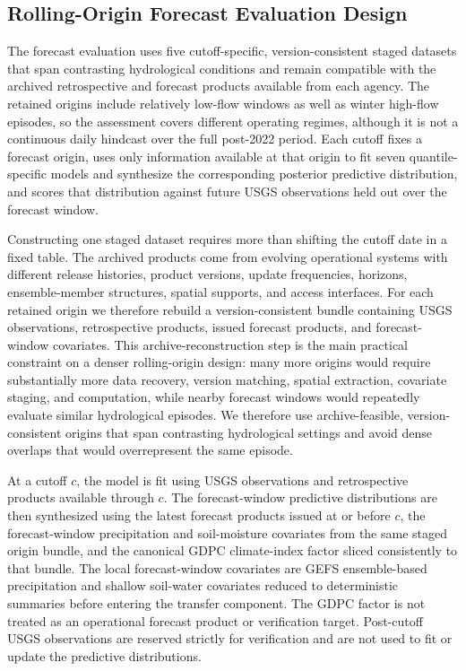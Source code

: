 \documentclass[APA,STIX1COL]{WileyNJD-v2}
\begin{document}
\subsection{Rolling-Origin Forecast Evaluation Design}

The forecast evaluation uses five cutoff-specific, version-consistent staged datasets that span contrasting hydrological conditions and remain compatible with the archived retrospective and forecast products available from each agency. The retained origins include relatively low-flow windows as well as winter high-flow episodes, so the assessment covers different operating regimes, although it is not a continuous daily hindcast over the full post-2022 period. Each cutoff fixes a forecast origin, uses only information available at that origin to fit seven quantile-specific models and synthesize the corresponding posterior predictive distribution, and scores that distribution against future USGS observations held out over the forecast window.

Constructing one staged dataset requires more than shifting the cutoff date in a fixed table. The archived products come from evolving operational systems with different release histories, product versions, update frequencies, horizons, ensemble-member structures, spatial supports, and access interfaces. For each retained origin we therefore rebuild a version-consistent bundle containing USGS observations, retrospective products, issued forecast products, and forecast-window covariates. This archive-reconstruction step is the main practical constraint on a denser rolling-origin design: many more origins would require substantially more data recovery, version matching, spatial extraction, covariate staging, and computation, while nearby forecast windows would repeatedly evaluate similar hydrological episodes. We therefore use archive-feasible, version-consistent origins that span contrasting hydrological settings and avoid dense overlaps that would overrepresent the same episode.

At a cutoff \(c\), the model is fit using USGS observations and retrospective products available through \(c\). The forecast-window predictive distributions are then synthesized using the latest forecast products issued at or before \(c\), the forecast-window precipitation and soil-moisture covariates from the same staged origin bundle, and the canonical GDPC climate-index factor sliced consistently to that bundle. The local forecast-window covariates are GEFS ensemble-based precipitation and shallow soil-water covariates reduced to deterministic summaries before entering the transfer component. The GDPC factor is not treated as an operational forecast product or verification target. Post-cutoff USGS observations are reserved strictly for verification and are not used to fit or update the predictive distributions.
\end{document}

